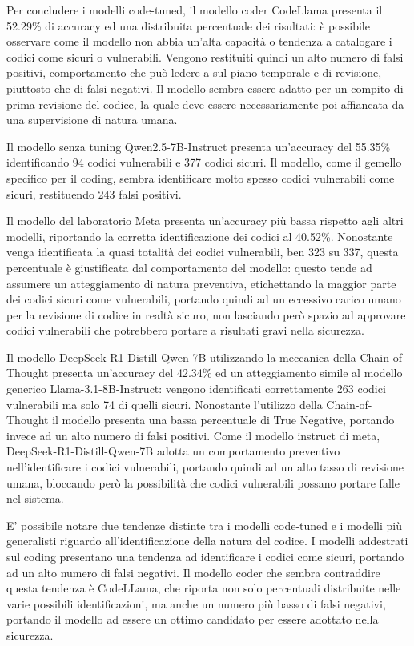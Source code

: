 Per concludere i modelli code-tuned, il modello coder CodeLlama presenta il 52.29\% di accuracy ed una distribuita percentuale dei risultati: è possibile osservare come il modello non abbia un'alta capacità o tendenza a catalogare i codici come sicuri o vulnerabili.
Vengono restituiti quindi un alto numero di falsi positivi, comportamento che può ledere a sul piano temporale e di revisione, piuttosto che di falsi negativi. 
Il modello sembra essere adatto per un compito di prima revisione del codice, la quale deve essere necessariamente poi affiancata da una supervisione di natura umana.

Il modello senza tuning Qwen2.5-7B-Instruct presenta un'accuracy del 55.35\% identificando 94 codici vulnerabili e 377 codici sicuri.
Il modello, come il gemello specifico per il coding, sembra identificare molto spesso codici vulnerabili come sicuri, restituendo 243 falsi positivi.

Il modello del laboratorio Meta presenta un'accuracy più bassa rispetto agli altri modelli, riportando la corretta identificazione dei codici al 40.52\%.
Nonostante venga identificata la quasi totalità dei codici vulnerabili, ben 323 su 337, questa percentuale è giustificata dal comportamento del modello: questo tende ad assumere un atteggiamento di natura preventiva, etichettando la maggior parte dei codici sicuri come vulnerabili, portando quindi ad un eccessivo carico umano per la revisione di codice in realtà sicuro, non lasciando però spazio ad approvare codici vulnerabili che potrebbero portare a risultati gravi nella sicurezza.

Il modello DeepSeek-R1-Distill-Qwen-7B utilizzando la meccanica della Chain-of-Thought presenta un'accuracy del 42.34\% ed un atteggiamento simile al modello generico Llama-3.1-8B-Instruct:
vengono identificati correttamente 263 codici vulnerabili ma solo 74 di quelli sicuri. 
Nonostante l'utilizzo della Chain-of-Thought il modello presenta una bassa percentuale di True Negative, portando invece ad un alto numero di falsi positivi.
Come il modello instruct di meta, DeepSeek-R1-Distill-Qwen-7B adotta un comportamento preventivo nell'identificare i codici vulnerabili, portando quindi ad un alto tasso di revisione umana, bloccando però la possibilità che codici vulnerabili possano portare falle nel sistema.

E' possibile notare due tendenze distinte tra i modelli code-tuned e i modelli più generalisti riguardo all'identificazione della natura del codice.
I modelli addestrati sul coding presentano una tendenza ad identificare i codici come sicuri, portando ad un alto numero di falsi negativi.
Il modello coder che sembra contraddire questa tendenza è CodeLLama, che riporta non solo percentuali distribuite nelle varie possibili identificazioni, ma anche un numero più basso di falsi negativi, portando il modello ad essere un ottimo candidato per essere adottato nella sicurezza.

